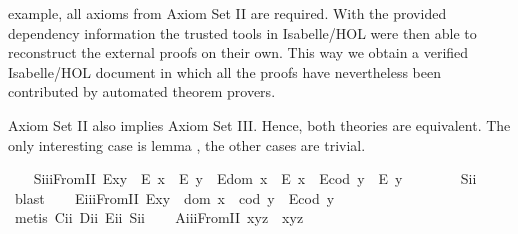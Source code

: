 \begin{isabellebody}
\begin{isamarkuptext}
 example, all  axioms from Axiom Set II are required. With the provided dependency information 
 the trusted tools in Isabelle/HOL were then able to reconstruct the external proofs on their own.
 This way we obtain a verified Isabelle/HOL document in which all the proofs have nevertheless been contributed
 by automated theorem provers.%
\end{isamarkuptext}\isamarkuptrue%
%
\begin{isamarkuptext}%
Axiom Set II also implies Axiom Set III. Hence, both theories are
 equivalent. The only interesting case is lemma , the other cases are 
 trivial.%
\end{isamarkuptext}\isamarkuptrue%
\isanewline
\ \ \isamarkupfalse%
\ S\isactrlsub i\isactrlsub i\isactrlsub iFromII{\isacharcolon}\ {\isachardoublequoteopen}{\isacharparenleft}E{\isacharparenleft}x{\isasymcdot}y{\isacharparenright}\ \isactrlbold {\isasymrightarrow}\ {\isacharparenleft}E\ x\ \isactrlbold {\isasymand}\ E\ y{\isacharparenright}{\isacharparenright}\ \isactrlbold {\isasymand}\ {\isacharparenleft}E{\isacharparenleft}dom\ x{\isacharparenright}\ \isactrlbold {\isasymrightarrow}\ E\ x{\isacharparenright}\ \isactrlbold {\isasymand}\ {\isacharparenleft}E{\isacharparenleft}cod\ y{\isacharparenright}\ \isactrlbold {\isasymrightarrow}\ E\ y{\isacharparenright}{\isachardoublequoteclose}\ \ \isanewline
%
\isadelimproof
\ \ \ \ %
\endisadelimproof
%
\isatagproof
{}\isamarkupfalse%
\ S\isactrlsub i\isactrlsub i\ \isamarkupfalse%
\ blast%
\endisatagproof
{\isafoldproof}%
%
\isadelimproof
\isanewline
%
\endisadelimproof
\ \ \isamarkupfalse%
\ E\isactrlsub i\isactrlsub i\isactrlsub iFromII{\isacharcolon}\ {\isachardoublequoteopen}E{\isacharparenleft}x{\isasymcdot}y{\isacharparenright}\ \isactrlbold {\isasymleftarrow}\ {\isacharparenleft}dom\ x\ {\isasymcong}\ cod\ y\ \isactrlbold {\isasymand}\ {\isacharparenleft}E{\isacharparenleft}cod\ y{\isacharparenright}{\isacharparenright}{\isacharparenright}{\isachardoublequoteclose}\ \isanewline
%
\isadelimproof
\ \ \ \ %
\endisadelimproof
%
\isatagproof
{}\isamarkupfalse%
\ {\isacharparenleft}metis\ C\isactrlsub i\isactrlsub i\ D\isactrlsub i\isactrlsub i\ E\isactrlsub i\isactrlsub i\ S\isactrlsub i\isactrlsub i{\isacharparenright}%
\endisatagproof
{\isafoldproof}%
%
\isadelimproof
\isanewline
%
\endisadelimproof
\ \ \isamarkupfalse%
\ A\isactrlsub i\isactrlsub i\isactrlsub iFromII{\isacharcolon}\ {\isachardoublequoteopen}x{\isasymcdot}{\isacharparenleft}y{\isasymcdot}z{\isacharparenright}\ {\isasymcong}\ {\isacharparenleft}x{\isasymcdot}y{\isacharparenright}{\isasymcdot}z{\isachardoublequoteclose}\ \isanewline

\end{isabellebody}
